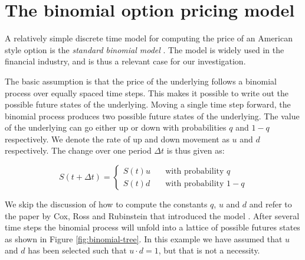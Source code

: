 \section{The binomial option pricing model}
A relatively simple discrete time model for computing the price of an
American style option is the \emph{standard binomial model}
\cite{cox1979option}. The model is widely used in the financial
industry\cite{ganesan2009acceleration}, and is thus a relevant case
for our investigation.

The basic assumption is that the price of the underlying follows a
binomial process over equally spaced time steps. This makes it
possible to write out the possible future states of the
underlying. Moving a single time step forward, the binomial process
produces two possible future states of the underlying. The value of
the underlying can go either up or down with probabilities $q$ and $1
- q$ respectively. We denote the rate of up and down movement as $u$
and $d$ respectively. The change over one period $\Delta t$ is thus
given as:

$$S(t+\Delta t) = \left\{
  \begin{array}{ll}
    S(t)u & \quad \text{with probability $q$} \\
    S(t)d & \quad \text{with probability $1-q$}
  \end{array} \right.
$$

We skip the discussion of how to compute the constants $q$, $u$ and
$d$ and refer to the paper by Cox, Ross and Rubinstein that introduced
the model \cite{cox1979option}. After several time steps the binomial
process will unfold into a lattice of possible futures states as shown
in Figure \ref{fig:binomial-tree}. In this example we have assumed
that $u$ and $d$ has been selected such that $u\cdot d = 1$, but that
is not a necessity.

